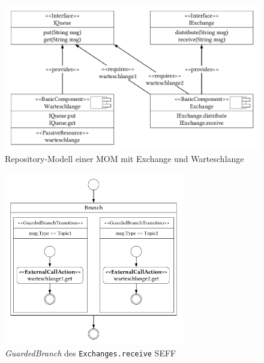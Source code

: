 \begin{figure}
\center
  \includegraphics[width=1\textwidth]{images/modelling/modelingRepository.pdf}
  \caption{Repository-Modell einer MOM mit Exchange und Warteschlange}
  \label{img:mom_repository}
\end{figure}

\begin{figure}
\center
  \includegraphics[width=0.7\textwidth]{images/modelling/modelingGuardedBranch.pdf}
  \caption{\emph{GuardedBranch} des \texttt{Exchanges.receive} SEFF}
  \label{img:queueBranch}
\end{figure}

